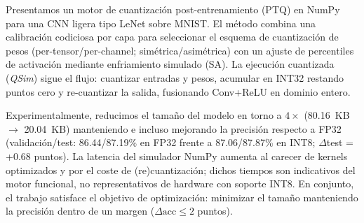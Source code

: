 Presentamos un motor de cuantización post-entrenamiento (PTQ) en NumPy para una CNN ligera tipo LeNet sobre MNIST. El método combina una calibración codiciosa por capa para seleccionar el esquema de cuantización de pesos (per-tensor/per-channel; simétrica/asimétrica) con un ajuste de percentiles de activación mediante enfriamiento simulado (SA). La ejecución cuantizada (\emph{QSim}) sigue el flujo: cuantizar entradas y pesos, acumular en INT32 restando puntos cero y re-cuantizar la salida, fusionando Conv+ReLU en dominio entero.

Experimentalmente, reducimos el tamaño del modelo en torno a $4\times$ (80.16~KB $\rightarrow$ 20.04~KB) manteniendo e incluso mejorando la precisión respecto a FP32 (validación/test: 86.44/87.19\% en FP32 frente a 87.06/87.87\% en INT8; $\Delta$test = +0.68 puntos). La latencia del simulador NumPy aumenta al carecer de kernels optimizados y por el coste de (re)cuantización; dichos tiempos son indicativos del motor funcional, no representativos de hardware con soporte INT8. En conjunto, el trabajo satisface el objetivo de optimización: minimizar el tamaño manteniendo la precisión dentro de un margen ($\Delta\mathrm{acc}\leq 2$ puntos).
